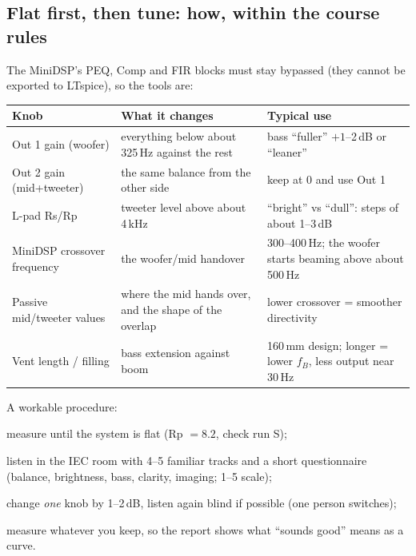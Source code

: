 \documentclass[11pt,a4paper]{article}
\begin{document}
\subsection*{Flat first, then tune: how, within the course rules}
The MiniDSP's PEQ, Comp and FIR blocks must stay bypassed (they cannot be exported to LTspice), so the tools are:
\begin{center}\small
\begin{tabular}{@{}>{\raggedright}p{4.2cm}>{\raggedright}p{5.2cm}p{5.4cm}@{}}\toprule
Knob & What it changes & Typical use\\\midrule
Out 1 gain (woofer) & everything below about 325\,Hz against the rest & bass ``fuller'' $+1$--2\,dB or ``leaner''\tabularnewline
Out 2 gain (mid+tweeter) & the same balance from the other side & keep at 0 and use Out 1\tabularnewline
L-pad Rs/Rp & tweeter level above about 4\,kHz & ``bright'' vs ``dull'': steps of about 1--3\,dB\tabularnewline
MiniDSP crossover frequency & the woofer/mid handover & 300--400\,Hz; the woofer starts beaming above about 500\,Hz\tabularnewline
Passive mid/tweeter values & where the mid hands over, and the shape of the overlap & lower crossover = smoother directivity\tabularnewline
Vent length / filling & bass extension against boom & 160\,mm design; longer = lower $f_B$, less output near 30\,Hz\tabularnewline\bottomrule
\end{tabular}
\end{center}
A workable procedure:
\begin{enumerate*}[label=(\arabic*)]
\item measure until the system is flat (Rp $= 8.2$, check run S);
\item listen in the IEC room with 4--5 familiar tracks and a short questionnaire (balance,
brightness, bass, clarity, imaging; 1--5 scale);
\item change \emph{one} knob by 1--2\,dB, listen again blind if possible (one person switches);
\item measure whatever you keep, so the report shows what ``sounds good'' means as a curve.
\end{enumerate*}
\end{document}
